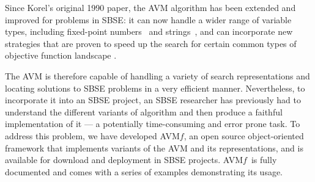 \documentclass{llncs}
\newcommand{\name}{AVM\hspace{-1pt}$f$\xspace}
\begin{document}
Since Korel's original 1990 paper, the AVM algorithm has been extended and improved for problems in SBSE: it can now handle a wider range of variable types, including fixed-point numbers~\cite{Harman2007} and strings~\cite{McMinn2015}, and can incorporate new strategies that are proven to speed up the search for certain common types of objective function landscape
\cite{%
Kempka2015}.

The AVM is therefore capable of handling a variety of search representations and locating solutions to SBSE problems in a very efficient manner. Nevertheless, to incorporate it into an SBSE project, an SBSE researcher has previously had to understand the different variants of algorithm and then produce a faithful implementation of it --- a potentially time-consuming and error prone task. To address this problem, we have developed \name, an open source object-oriented framework that implements variants of the AVM and its representations, and is available for download and deployment in SBSE projects. \name~is fully documented and comes with a series of examples demonstrating its usage.


\end{document}
